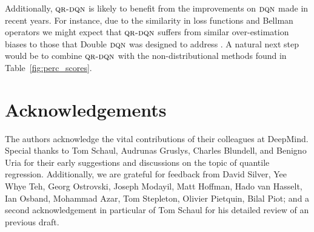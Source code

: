 \documentclass[letterpaper]{article}
\def \dqn {\textsc{dqn}}
\def \qrdqn {\textsc{qr-dqn}}
\begin{document}
Additionally, $\qrdqn$ is likely to benefit from the improvements on $\dqn$ made in recent years. For instance, due to the similarity in loss functions and Bellman operators we might expect that $\qrdqn$ suffers from similar over-estimation biases to those that Double $\dqn$ was designed to address \cite{vanhasselt16deep}. A natural next step would be to combine $\qrdqn$ with the non-distributional methods found in Table~\ref{fig:perc_scores}.

\section*{Acknowledgements}
The authors acknowledge the vital contributions of their colleagues at DeepMind. Special thanks to Tom Schaul, Audrunas Gruslys, Charles Blundell, and Benigno Uria for their early suggestions and discussions on the topic of quantile regression. Additionally, we are grateful for feedback from David Silver, Yee Whye Teh, Georg Ostrovski, Joseph Modayil, Matt Hoffman, Hado van Hasselt, Ian Osband, Mohammad Azar, Tom Stepleton, Olivier Pietquin, Bilal Piot; and a second acknowledgement in particular of Tom Schaul for his detailed review of an previous draft.
\end{document}
